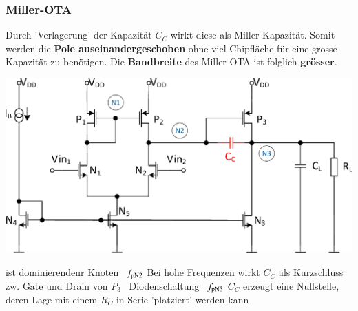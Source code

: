 \subsubsection{Miller-OTA}

Durch 'Verlagerung' der Kapazität $C_C$ wirkt diese als Miller-Kapazität. 
Somit werden die \textbf{Pole auseinandergeschoben} ohne viel Chipfläche für eine grosse Kapazität zu benötigen.
Die \textbf{Bandbreite} des Miller-OTA ist folglich \textbf{grösser}.

\smallskip

\begin{minipage}[t]{0.48\columnwidth}
    \includegraphics[width=\columnwidth, align=t]{images/11_OTA_zweistufig_miller.pdf}
\end{minipage}
\hfill
\begin{minipage}[t]{0.48\columnwidth}
    \begin{outline}
        \1  ist dominierendenr Knoten \textrightarrow\ $f_{\rm pN2}$
        \1 Bei hohe Frequenzen wirkt $C_C$ als Kurzschluss zw. Gate und Drain von $P_3$ \textrightarrow\ Diodenschaltung \textrightarrow\ $f_{\rm pN3}$
        \1 $C_C$ erzeugt eine Nullstelle, deren Lage mit einem $R_C$ in Serie 'platziert' werden kann
    \end{outline} 
\end{minipage}


